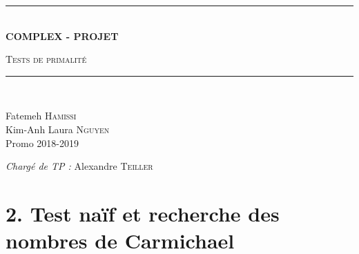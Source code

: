 \documentclass[a4paper]{article}
\newcommand{\HRule}{\rule{\linewidth}{0.5mm}}
\begin{document}
\begin{titlepage}
  \begin{center}


      \vspace{4cm}
    \HRule \\[0.4cm]
    { \huge \bfseries COMPLEX - PROJET\\[0.4cm] }

      \textsc{\LARGE Tests de primalité}\\[0.4cm]

    \HRule \\[0.8cm]

    \begin{minipage}{0.4\textwidth}
      \begin{flushleft} \large
        Fatemeh \textsc{Hamissi}\\
        \large
        Kim-Anh Laura \textsc{Nguyen}\\
        Promo 2018-2019 \\
      \end{flushleft}
    \end{minipage}
    \begin{minipage}{0.5\textwidth}
      \begin{flushright} \large
        \emph{Chargé de TP :} Alexandre \textsc{Teiller}\\
      \end{flushright}
    \end{minipage}

      \vspace{2cm}

  \end{center}
\end{titlepage}

\section*{2. Test naïf et recherche des nombres de Carmichael}
\end{document}
